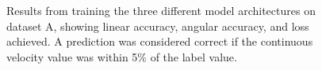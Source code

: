 \documentclass{article}
\begin{document}
\begin{figure}
  \hfill
  \hfill
  \caption{Results from training the three different model architectures on dataset A, showing linear accuracy, angular accuracy, and loss achieved. A prediction was considered correct if the continuous velocity value was within 5\% of the label value.}
  \label{fig:training_results}
\end{figure}
\end{document}

